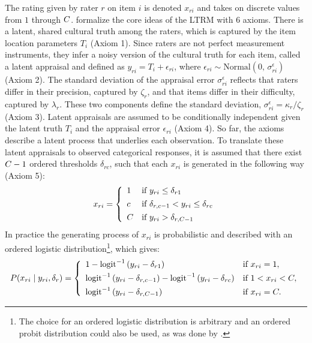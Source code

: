 \documentclass{article}
\newcommand{\Irater}{r}
\newcommand{\Iitem}{i}
\newcommand{\Incat}{c}
\newcommand{\Tncat}{\expandafter\MakeUppercase\expandafter{\Incat}}
\newcommand{\ilogit}[1]{\text{logit}^{-1}\left(#1\right)}
\newcommand{\dnorm}[2]{\text{Normal}\left(#1,\,#2\right)}
\begin{document}
The rating given by rater $\Irater$ on item $\Iitem$ is denoted $x_{\Irater\Iitem}$ and takes on discrete values from $1$ through $\Tncat$.  formalize the core ideas of the LTRM with 6 axioms. There is a latent, shared cultural truth among the raters, which is captured by the item location parameters $T_\Iitem$ (Axiom 1). Since raters are not perfect measurement instruments, they infer a noisy version of the cultural truth for each item, called a latent appraisal and defined as $y_{\Irater\Iitem} = T_\Iitem + \epsilon_{\Irater\Iitem}$, where $\epsilon_{\Irater\Iitem}\sim \dnorm{0}{\sigma^\epsilon_{\Irater\Iitem}}$ (Axiom 2). The standard deviation of the appraisal error $\sigma^\epsilon_{\Irater\Iitem}$ reflects that raters differ in their precision, captured by $\zeta_\Irater$, and that items differ in their difficulty, captured by $\lambda_\Irater$. These two components define the standard deviation, $\sigma^\epsilon_{\Irater\Iitem} = \kappa_\Irater / \zeta_\Irater$ (Axiom 3). Latent appraisals are assumed to be conditionally independent given the latent truth $T_\Iitem$ and the appraisal error $\epsilon_{\Irater\Iitem}$ (Axiom 4). So far, the axioms describe a latent process that underlies each observation. To translate these latent appraisals to observed categorical responses, it is assumed that there exist $\Tncat - 1$ ordered thresholds $\delta_{\Irater\Incat}$, such that each $x_{\Irater\Iitem}$ is generated in the following way (Axiom 5):
\begin{align*}
	x_{\Irater\Iitem} = 
	\left\{\begin{array}{ll} 
	1		& \text{if } y_{\Irater\Iitem} \leq \delta_{\Irater 1} \\[4pt]
	\Incat	& \text{if } \delta_{\Irater, \Incat-1} < y_{\Irater\Iitem} \leq \delta_{\Irater\Incat} \\[4pt]
	\Tncat	& \text{if } y_{\Irater\Iitem} > \delta_{\Irater, \Tncat-1}
	\end{array} \right.
\end{align*}
In practice the generating process of $x_{\Irater\Iitem}$ is probabilistic and described with an ordered logistic distribution\footnote{The choice for an ordered logistic distribution is arbitrary and an ordered probit distribution could also be used, as was done by .}, which gives:
\begin{align*}
P(x_{\Irater\Iitem}\mid y_{\Irater\Iitem},\delta_{\Irater}) = 
\left\{\begin{array}{ll} 
1 - \ilogit{y_{\Irater\Iitem} - \delta_{\Irater 1}}         & \text{if } x_{\Irater\Iitem} = 1, \\[4pt]
\ilogit{y_{\Irater\Iitem} - \delta_{\Irater,\Incat-1}} - 
\ilogit{y_{\Irater\Iitem} - \delta_{\Irater\Incat}}         & \text{if } 1 < x_{\Irater\Iitem} < \Tncat,\\[4pt]
\ilogit{y_{\Irater\Iitem} - \delta_{\Irater,\Tncat-1}}       & \text{if } x_{\Irater\Iitem} = \Tncat. 
\end{array} \right.
\end{align*}
\end{document}
